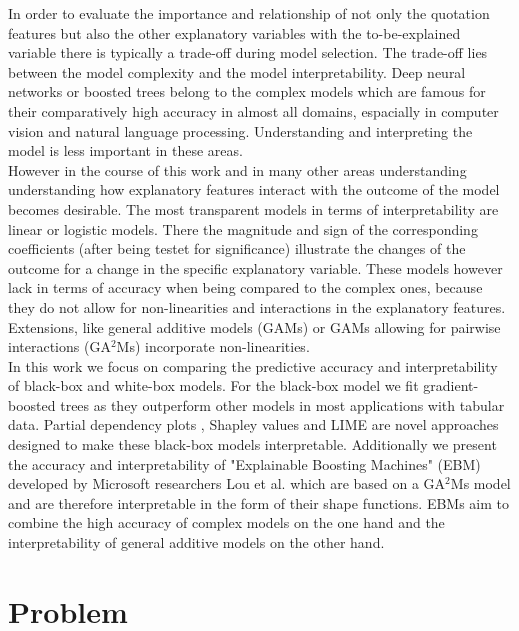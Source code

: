 \documentclass[12pt,titlepage]{article}
\begin{document}
In order to evaluate the importance and relationship of not only the quotation features but also the other explanatory variables with the to-be-explained variable there is typically a trade-off during model selection. The trade-off lies between the model complexity and the model interpretability. Deep neural networks or boosted trees belong to the complex models which are famous for their comparatively high accuracy in almost all domains, espacially in computer vision and natural language processing. Understanding and interpreting the model is less important in these areas. \\ However in the course of this work and in many other areas understanding understanding how explanatory features interact with the outcome of the model becomes desirable. The most transparent models in terms of interpretability are linear or logistic models. There the magnitude and sign of the corresponding coefficients (after being testet for significance) illustrate the changes of the outcome for a change in the specific explanatory variable. These models however lack in terms of accuracy when being compared to the complex ones, because they do not allow for non-linearities and interactions in the explanatory features. Extensions, like general additive models (GAMs) \cite{gam} or GAMs allowing for pairwise interactions (GA$^{2}$Ms) \cite{ga2m} incorporate non-linearities.\\
In this work we focus on comparing the predictive accuracy and interpretability of black-box and white-box models. For the black-box model we fit gradient-boosted trees \cite{gbt} as they outperform other models in most applications with tabular data. Partial dependency plots \cite{pdp}, Shapley values \cite{shap} and LIME \cite{lime} are novel approaches designed to make these black-box models interpretable. Additionally we present the accuracy and interpretability of "Explainable Boosting Machines" (EBM) developed by Microsoft researchers Lou et al. \cite{interpretml} which are based on a GA$^{2}$Ms model and are therefore interpretable in the form of their shape functions. EBMs aim to combine the high accuracy of complex models on the one hand and the interpretability of general additive models on the other hand. \\

\section{Problem} \par
\end{document}
